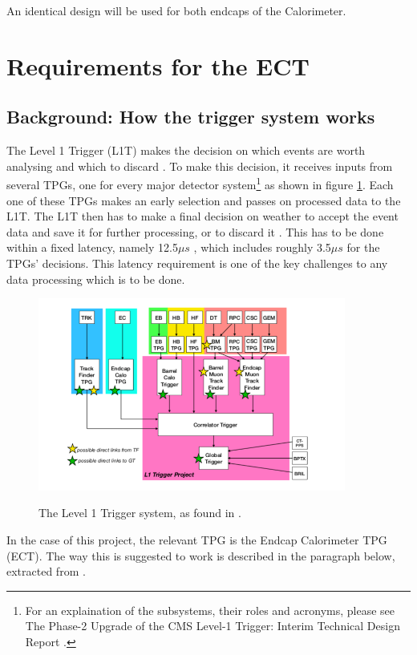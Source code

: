 \documentclass[12 pt]{article}
\begin{document}
			An identical design will be used for both endcaps of the Calorimeter. 


	\section{Requirements for the ECT}\label{tpg}
		\subsection{Background: How the trigger system works}

			The Level 1 Trigger (L1T) makes the decision on which events are worth analysing and which to discard \cite{TDR} \cite{itdr}. To make this decision, it receives inputs from several TPGs, one for every major detector system\footnote{For an explaination of the subsystems, their roles and acronyms, please see The Phase-2 Upgrade of the CMS Level-1 Trigger: Interim Technical Design Report \cite{itdr}.} \cite{itdr} as shown in figure \ref{l1t_system}. Each one of these TPGs makes an early selection and passes on processed data to the L1T. The L1T then has to make a final decision on weather to accept the event data and save it for further processing, or to discard it \cite{TDR,itdr}. This has to be done within a fixed latency, namely 12.5$\mu s$ \cite{TDR}, which includes roughly 3.5$\mu s$ for the TPGs' decisions. This latency requirement is one of the key challenges to any data processing which is to be done. 

			\begin{figure}[H]
				\centering
				\includegraphics[width=0.9\textwidth]{L1t_system.png}
				\label{l1t_system}
				\caption{The Level 1 Trigger system, as found in \cite{itdr}.}
			\end{figure}

			In the case of this project, the relevant TPG is the Endcap Calorimeter TPG (ECT). The way this is suggested to work is described in the paragraph below, extracted from \cite{itdr}.
\end{document}
